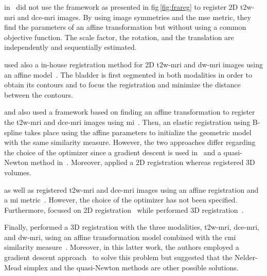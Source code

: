 \citeauthor{Ampeliotis2008} in~\cite{Ampeliotis2007,Ampeliotis2008} did not use the framework as presented in \acs{fig}\,\ref{fig:frareg} to register 2D \ac{t2w}-\ac{mri} and \ac{dce}-\ac{mri} images.
By using image symmetries and the \ac{mse} metric, they find the parameters of an affine transformation but without using a common objective function.
The scale factor, the rotation, and the translation are independently and sequentially estimated.

\cite{Giannini2013} used also a in-house registration method for 2D \ac{t2w}-\ac{mri} and \ac{dw}-\ac{mri} images using an affine model~\cite{Giannini2013,giannini2015fully}.
The bladder is first segmented in both modalities in order to obtain its contours and to focus the registration and minimize the distance between the contours.

\citeauthor{Giannini2013} and also \citeauthor{Vos2010} used a framework based on finding an affine transformation to register the \ac{t2w}-\ac{mri} and \ac{dce}-\ac{mri} images using \ac{mi}~\cite{Rueckert1999,Giannini2013,Vos2010}.
Then, an elastic registration using B-spline takes place using the affine parameters to initialize the geometric model with the same similarity measure.
However, the two approaches differ regarding the choice of the optimizer since a gradient descent is used in~\cite{Giannini2013} and a quasi-Newton method in~\cite{Vos2010}.
Moreover, \citeauthor{Giannini2013} applied a 2D registration whereas \citeauthor{Vos2010} registered 3D volumes.

\citeauthor{Viswanath2008a} as well as \citeauthor{Vos2008} registered \ac{t2w}-\ac{mri} and \ac{dce}-\ac{mri} images using an affine registration and a \ac{mi} metric~\cite{Viswanath2008a,Viswanath2009,Vos2008}.
However, the choice of the optimizer has not been specified. 
Furthermore, \citeauthor{Viswanath2008a} focused on 2D registration~\cite{Viswanath2008a,Viswanath2009} while \citeauthor{Vos2008} performed 3D registration~\cite{Vos2008}.

Finally, \citeauthor{Viswanath2011} performed a 3D registration with the three modalities, \ac{t2w}-\ac{mri}, \ac{dce}-\ac{mri}, and \ac{dw}-\ac{mri}, using an affine transformation model combined with the \ac{cmi} similarity measure~\cite{Viswanath2011}.
Moreover, in this latter work, the authors employed a gradient descent approach~\cite{Chappelow2011} to solve this problem but suggested that the Nelder-Mead simplex and the quasi-Newton methods are other possible solutions.

